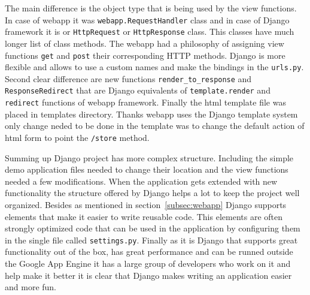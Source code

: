 
The main difference is the object type that is being used by the view functions. In case of webapp it was \texttt{webapp.RequestHandler} class and in case of Django framework it is or \texttt{HttpRequest} or \texttt{HttpResponse} class. This classes have much longer list of class methods. The webapp had a philosophy of assigning view functions \texttt{get} and \texttt{post} their corresponding HTTP methods. Django is more flexible and allows to use a custom names and make the bindings in the \texttt{urls.py}. Second clear difference are new functions \texttt{render\_to\_response} and\\ \texttt{ResponseRedirect} that are Django equivalents of \texttt{template.render} and \texttt{redirect} functions of webapp framework. Finally the html template file  was placed in templates directory. Thanks webapp uses the Django template system only change neded to be done in the template was to change the default action of html form to point the \texttt{/store} method.

Summing up Django project has more complex structure. Including the simple demo application files needed to change their location and the view functions needed a few modifications.  When the application gets extended with new functionality the structure offered by Django helps a lot to keep the project well organized. Besides as mentioned in section~\ref{subsec:webapp} Django supports elements that make it easier to write reusable code. This elements are often strongly optimized code that can be used in the application by configuring them in the single file called \texttt{settings.py}. Finally as it is Django that supports great functionality out of the box, has great performance and can be runned outside the Google App Engine it has a large group of developers who work on it and help make it better it is clear that Django makes writing an application easier and more fun. 